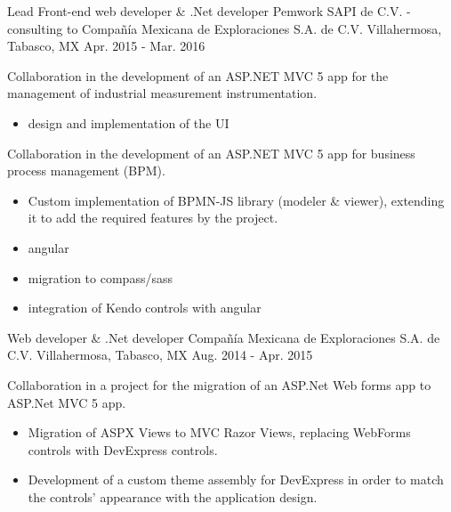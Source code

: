 \begin{cventries}

\cventry
{Lead Front-end web developer \& .Net developer} %
{Pemwork SAPI de C.V. - consulting to Compañía Mexicana de Exploraciones S.A. de C.V.} %
{Villahermosa, Tabasco, MX} %
{Apr. 2015 - Mar. 2016} %
{ %
	\begin{cvitems}
		\item{Collaboration in the development of an ASP.NET MVC 5 app for the management of industrial measurement instrumentation. }
		\begin{itemize}
			\item{design and implementation of the UI}
		\end{itemize}		
		\item{Collaboration in the development of an ASP.NET MVC 5 app for business process management (BPM). }
		\begin{itemize}
			\item{Custom implementation of BPMN-JS library (modeler \& viewer), extending it to add the required features by the project. }
			\item{angular}
			\item{migration to compass/sass}
			\item{integration of Kendo controls with angular}
		\end{itemize}
	\end{cvitems}
}


\cventry
{Web developer \& .Net developer} %
{Compañía Mexicana de Exploraciones S.A. de C.V.} %
{Villahermosa, Tabasco, MX} %
{Aug. 2014 - Apr. 2015} %
{ %
	\begin{cvitems}
		\item {Collaboration in a project for the migration of an ASP.Net Web forms app to ASP.Net MVC 5 app.}
		\begin{itemize}
			\item {Migration of ASPX Views to MVC Razor Views, replacing WebForms controls with DevExpress controls.}
			\item {Development of a custom theme assembly for DevExpress in order to match the controls' appearance with the application design.}
		\end{itemize}
	\end{cvitems}
}


\end{cventries}
